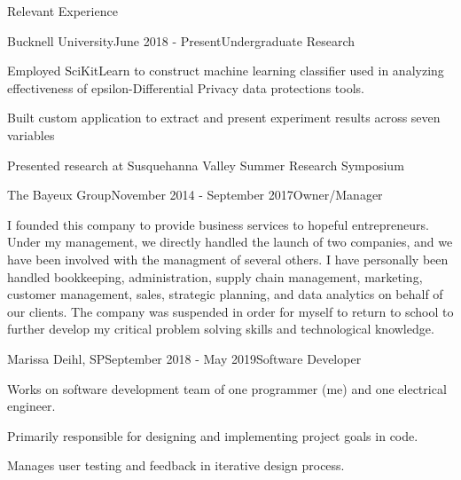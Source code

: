 \documentclass{resume} %
\begin{document}
\begin{rSection}{Relevant Experience}


\begin{rSubsection}{Bucknell University}{June 2018 - Present}{Undergraduate Research}{}
\item Employed SciKitLearn to construct machine learning classifier used in analyzing effectiveness of epsilon-Differential Privacy data protections tools.
\item Built custom application to extract and present experiment results across seven variables
\item Presented research at Susquehanna Valley Summer Research Symposium
\end{rSubsection}


\begin{rSubsection}{The Bayeux Group}{November 2014 - September 2017}{Owner/Manager}{}
\item I founded this company to provide business services to hopeful entrepreneurs. Under my management, we directly handled the launch of two companies, and we have been involved with the managment of several others. I have personally been handled bookkeeping, administration, supply chain management, marketing, customer management, sales, strategic planning, and data analytics on behalf of our clients. The company was suspended in order for myself to return to school to further develop my critical problem solving skills and technological knowledge.
\end{rSubsection}


\begin{rSubsection}{Marissa Deihl, SP}{September 2018 - May 2019}{Software Developer}{}
\item Works on software development team of one programmer (me) and one electrical engineer.
\item Primarily responsible for designing and implementing project goals in code.
\item Manages user testing and feedback in iterative design process.
\end{rSubsection}


\end{rSection}
\end{document}

